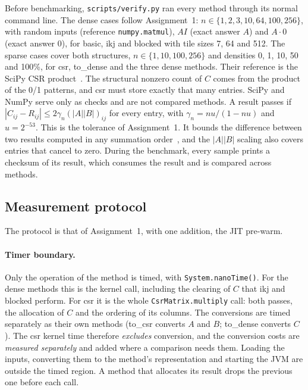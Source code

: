 \documentclass[11pt,a4paper]{article}
\begin{document}
Before benchmarking, \texttt{scripts/verify.py} ran every method through its
normal command line. The dense cases follow Assignment~1:
$n\in\{1,2,3,10,64,100,256\}$, with random inputs (reference
\texttt{numpy.matmul}), $AI$ (exact answer $A$) and $A\cdot0$ (exact answer $0$),
for basic, ikj and blocked with tile sizes 7, 64 and 512. The sparse cases cover
both structures, $n\in\{1,10,100,256\}$ and densities 0, 1, 10, 50 and 100\%,
for csr, to\_dense and the three dense methods. Their reference is the SciPy CSR
product~\cite{virtanen2020}. The structural nonzero count of $C$ comes from the
product of the 0/1 patterns, and csr must store exactly that many entries.
SciPy and NumPy serve only as checks and are not compared methods. A result
passes if $|C_{ij}-R_{ij}|\le 2\gamma_n(|A||B|)_{ij}$ for every entry, with
$\gamma_n=nu/(1-nu)$ and $u=2^{-53}$. This is the tolerance of Assignment~1. It
bounds the difference between two results computed in any summation
order~\cite{higham2002}, and the $|A||B|$ scaling also covers entries that cancel
to zero. During the benchmark, every sample prints a checksum of its result,
which consumes the result and is compared across methods.

\subsection{Measurement protocol}
\label{sec:protocol}

The protocol is that of Assignment~1, with one addition, the JIT pre-warm.

\paragraph{Timer boundary.} Only the operation of the method is timed, with
\texttt{System.nanoTime()}. For the dense methods this is the kernel call,
including the clearing of $C$ that ikj and blocked perform. For csr it is the
whole \texttt{CsrMatrix.multiply} call: both passes, the allocation of $C$ and
the ordering of its columns. The conversions are timed separately as their own
methods (to\_csr converts $A$ and $B$; to\_dense converts $C$). The csr kernel
time therefore \emph{excludes} conversion, and the conversion costs are
\emph{measured separately} and added where a comparison needs them. Loading the
inputs, converting them to the method's representation and starting the JVM are
outside the timed region. A method that allocates its result drops the previous
one before each call.
\end{document}
